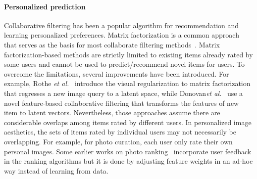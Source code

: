 \paragraph{Personalized prediction}
Collaborative filtering has been a popular algorithm for recommendation and learning personalized preferences. 
Matrix factorization is a common approach that serves as the basis for most collaborate filtering methods~\cite{koren2009matrix, lee2001algorithms}. Matrix factorization-based methods are strictly limited to existing items already rated by some users and cannot be used to predict/recommend novel items for users. To overcome the limitations, several improvements have been introduced. For example, Rothe \textsl{et al.}~\cite{rothe2015some} introduce the visual regularization to matrix factorization that regresses a new image query to a latent space, while Donovan\textsl{et al.}~\cite{o2014collaborative} use a novel feature-based collaborative filtering that transforms the features of new item to latent vectors. Nevertheless, those approaches assume there are considerable overlaps among items rated by different users. In personalized image aesthetics, the sets of items rated by individual users may not necessarily be overlapping. For example, for photo curation, each user only rate their own personal images. Some earlier works on photo ranking~\cite{yeh2010personalized, yeh2014personalized} incorporate user feedback in the ranking algorithms but it is done by adjusting feature weights in an ad-hoc way instead of learning from data.  
